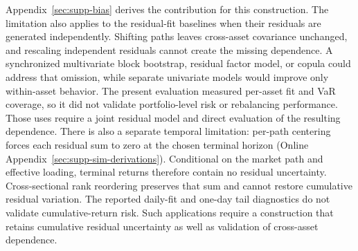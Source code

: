 Appendix~\ref{sec:supp-bias} derives the contribution for this
construction. The limitation also applies to the residual-fit
baselines when their residuals are generated independently. Shifting
paths leaves cross-asset covariance unchanged, and rescaling
independent residuals cannot create the missing dependence. A
synchronized multivariate block bootstrap, residual factor model, or
copula could address that omission, while separate univariate models
would improve only within-asset behavior. The present evaluation
measured per-asset fit and VaR coverage, so it did not validate
portfolio-level risk or rebalancing performance. Those uses require a
joint residual model and direct evaluation of the resulting dependence.
There is also a separate temporal limitation: per-path centering
forces each residual sum to zero at the chosen terminal horizon
(Online Appendix~\ref{sec:supp-sim-derivations}). Conditional on the
market path and effective loading, terminal returns therefore contain
no residual uncertainty. Cross-sectional rank reordering preserves
that sum and cannot restore cumulative residual variation. The
reported daily-fit and one-day tail diagnostics do not validate
cumulative-return risk. Such applications require a construction that
retains cumulative residual uncertainty as well as validation of
cross-asset dependence.
